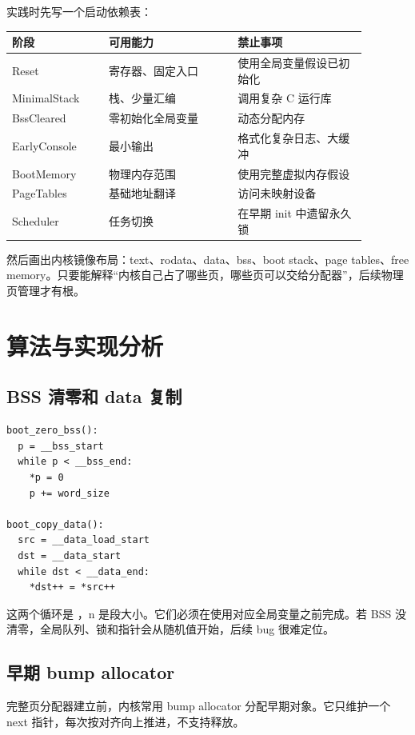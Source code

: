 实践时先写一个启动依赖表：

\begin{longtable}{p{0.24\linewidth}p{0.32\linewidth}p{0.32\linewidth}}
\toprule
阶段 & 可用能力 & 禁止事项 \\
\midrule
Reset & 寄存器、固定入口 & 使用全局变量假设已初始化 \\
MinimalStack & 栈、少量汇编 & 调用复杂 C 运行库 \\
BssCleared & 零初始化全局变量 & 动态分配内存 \\
EarlyConsole & 最小输出 & 格式化复杂日志、大缓冲 \\
BootMemory & 物理内存范围 & 使用完整虚拟内存假设 \\
PageTables & 基础地址翻译 & 访问未映射设备 \\
Scheduler & 任务切换 & 在早期 init 中遗留永久锁 \\
\bottomrule
\end{longtable}

然后画出内核镜像布局：text、rodata、data、bss、boot stack、page tables、free memory。只要能解释“内核自己占了哪些页，哪些页可以交给分配器”，后续物理页管理才有根。

\section{算法与实现分析}

\subsection{BSS 清零和 data 复制}

\begin{lstlisting}
boot_zero_bss():
  p = __bss_start
  while p < __bss_end:
    *p = 0
    p += word_size

boot_copy_data():
  src = __data_load_start
  dst = __data_start
  while dst < __data_end:
    *dst++ = *src++
\end{lstlisting}

这两个循环是 ，n 是段大小。它们必须在使用对应全局变量之前完成。若 BSS 没清零，全局队列、锁和指针会从随机值开始，后续 bug 很难定位。

\subsection{早期 bump allocator}

完整页分配器建立前，内核常用 bump allocator 分配早期对象。它只维护一个 next 指针，每次按对齐向上推进，不支持释放。


